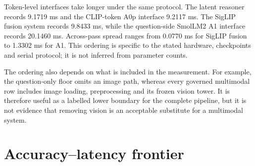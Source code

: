 Token-level interfaces take longer under the same protocol. The latent
reasoner records 9.1719 ms and the CLIP-token A0p interface 9.2117 ms. The
SigLIP fusion system records 9.8433 ms, while the question-side SmolLM2 A1
interface records 20.1460 ms. Across-pass spread ranges from 0.0770 ms for
SigLIP fusion to 1.3302 ms for A1. This ordering is specific to the stated
hardware, checkpoints and serial protocol; it is not inferred from parameter
counts.

The ordering also depends on what is included in the measurement. For
example, the question-only floor omits an image path, whereas every governed
multimodal row includes image loading, preprocessing and its frozen vision
tower. It is therefore useful as a labelled lower boundary for the complete
pipeline, but it is not evidence that removing vision is an acceptable
substitute for a multimodal system.

\begin{table}[p]
\centering
\caption[E7b serial latency, accuracy and parameter counts.]{Seed-0 250k development checkpoints under the E7b end-to-end serial protocol on \texttt{otter155}. Supported-view accuracy uses the answer space shown and is not a common metric across the top-100 and top-1000 rows. Raw-distribution accuracy uses the common 10,004-row view. The canonical frontier uses only that raw accuracy and warm median latency; question only is excluded as a non-multimodal floor. Medians and across-pass spreads are latency summaries, not confidence intervals.}
\label{tab:ch7-e7b}
\begingroup\scriptsize\setlength{\tabcolsep}{0.55pt}
\makeatletter
\let\chSevenArrayParboxRestore\@arrayparboxrestore
\def\@arrayparboxrestore{\chSevenArrayParboxRestore\raggedright\let\\\tabularnewline}
\makeatother
\renewenvironment{longtable}[1]{\begin{tabular}{|p{0.12\textwidth}|p{0.105\textwidth}|p{0.078\textwidth}|p{0.078\textwidth}|p{0.076\textwidth}|p{0.062\textwidth}|p{0.10\textwidth}|p{0.115\textwidth}|p{0.075\textwidth}|}}{\end{tabular}}
\let\endhead\relax\renewcommand{\_}{\textunderscore\allowbreak}

\endgroup
\end{table}

\section{Accuracy--latency frontier}
\label{sec:ch7-frontier}

